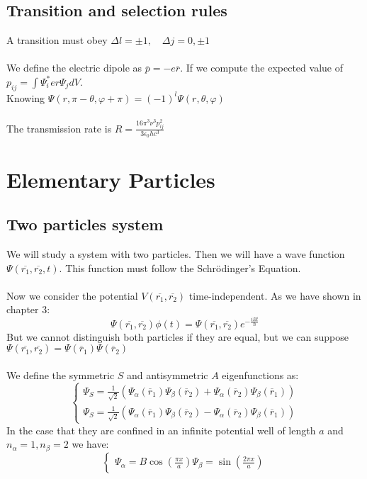 \documentclass{myclass}
\newcommand{\h}{\hbar}
\begin{document}
\subsection{Transition and selection rules}
A transition must obey $\Delta l = \pm 1, \quad \Delta j = 0, \pm 1$ \\
\\
We define the electric dipole as $\overline{p} = -e\overline{r}$. If we compute the expected value of $p_{ij} = \int \Psi_i^* er\Psi_jdV$. \\
Knowing $\Psi(r, \pi-\theta, \varphi  + \pi) = (-1)^l\Psi(r, \theta, \varphi )$ \\
\\
The transmission rate is $\displaystyle R = \frac{16\pi^3\nu^3p_{ij}^2}{3 \epsilon_0 h c^3}$

\section{Elementary Particles}
\subsection{Two particles system}
We will study a system with two particles. Then we will have a wave function $\Psi \left( \overline{r_1}, \overline{r_2}, t \right) $. This function must follow the Schrödinger's Equation. \\
\\
Now we consider the potential $V(\overline{r_1}, \overline{r_2})$ time-independent. As we have shown in chapter 3:
\[
\Psi\left( \overline{r_1}, \overline{r_2} \right)\phi(t) = \Psi(\overline{r_1}, \overline{r_2})e^{-\frac{iEt}{\h}}
\] 
But we cannot distinguish both particles if they are equal, but we can suppose $\Psi\left( \overline{r_1}, \overline{r_2} \right) = \Psi(\overline{r}_1)\Psi(\overline{r}_2)$ \\
\\
We define the symmetric $S$ and antisymmetric $A$ eigenfunctions as:
\[
\begin{cases}
\Psi_S = \frac{1}{\sqrt{2} }\left( \Psi_\alpha(\overline{r}_1)\Psi_\beta(\overline{r}_2) + \Psi_\alpha(\overline{r}_2)\Psi_\beta(\overline{r}_1) \right) \\
\Psi_S = \frac{1}{\sqrt{2} }\left( \Psi_\alpha(\overline{r}_1)\Psi_\beta(\overline{r}_2) - \Psi_\alpha(\overline{r}_2)\Psi_\beta(\overline{r}_1) \right) 
\end{cases}   
\] 
In the case that they are confined in an infinite potential well of length $a$ and $n_\alpha = 1, n_\beta = 2$ we have:
\[
\begin{cases}
  \Psi_\alpha = B\cos\left( \frac{\pi x}{a} \right) 
  \Psi_\beta = \sin\left( \frac{2\pi x}{a} \right) 
\end{cases}
\] 
\end{document}
